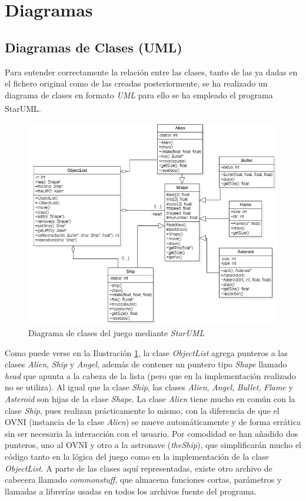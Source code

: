 \section{Diagramas}
\subsection{Diagramas de Clases (UML)}
Para entender correctamente la relación entre las clases, tanto de las ya dadas en el fichero original como de las creadas posteriormente, se ha realizado un diagrama de clases en formato \emph{UML} para ello se ha empleado el programa StarUML\textsuperscript{\textregistered}.

\begin{figure}[H]
    \centering
    \includegraphics[width=\textwidth]{fotos/UML.PNG}
    \caption{Diagrama de clases del juego mediante \emph{StarUML}}
    \label{uml}
\end{figure}

Como puede verse en la Ilustración \ref{uml}, la clase \emph{ObjectList} agrega punteros a las clases \emph{Alien}, \emph{Ship} y \emph{Angel}, además de contener un puntero tipo \emph{Shape} llamado \textit{head} que apunta a la cabeza de la lista (pero que en la implementación realizado no se utiliza). Al igual que la clase \emph{Ship}, las clases \emph{Alien}, \emph{Angel}, \emph{Bullet}, \emph{Flame} y \emph{Asteroid} son hijas de la clase \emph{Shape}. La clase \emph{Alien} tiene mucho en común con la clase \emph{Ship}, pues realizan prácticamente lo mismo, con la diferencia de que el OVNI (instancia de la clase \emph{Alien}) se mueve automáticamente y de forma errática sin ser necesaria la interacción con el usuario. Por comodidad se han añadido dos punteros, uno al OVNI y otro a la astronave (\emph{theShip}), que simplificarán mucho el código tanto en la lógica del juego como en la implementación de la clase \emph{ObjectList}.
A parte de las clases aquí representadas, existe otro archivo de cabecera llamado \emph{commonstuff}, que almacena funciones cortas, parámetros y llamadas a librerías usadas en todos los archivos fuente del programa.


